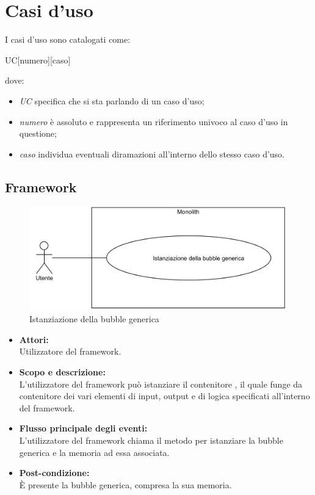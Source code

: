 \section{Casi d'uso}
I casi d'uso sono catalogati come:
\begin{center}
	UC[numero][caso]
\end{center}
dove:
\begin{itemize}
	\item \textit{UC} specifica che si sta parlando di un caso d'uso;
	\item \textit{numero} è assoluto e rappresenta un riferimento univoco al caso d'uso in questione;
	\item \textit{caso} individua eventuali diramazioni all'interno dello stesso caso d'uso.
\end{itemize}

\subsection{Framework}


\begin{figure}[H]
	\centering
	\includegraphics[width=15cm]{../../documenti/AnalisiDeiRequisiti/Diagrammi_img/uc1_35.png}
	\caption{\UCCaption{} Istanziazione della bubble generica}
\end{figure}

\begin{itemize}
	\item \textbf{Attori:}
	\\Utilizzatore del framework.
	\item \textbf{Scopo e descrizione:} 
	\\L'utilizzatore del framework può istanziare il contenitore , il quale funge da contenitore dei vari elementi di input, output e di logica specificati all'interno del framework.
	\item \textbf{Flusso principale degli eventi:}
	\\L'utilizzatore del framework chiama il metodo per istanziare la bubble generica e la memoria ad essa associata.
	\item \textbf{Post-condizione:}
	\\È presente la bubble generica, compresa la sua memoria.
\end{itemize}

